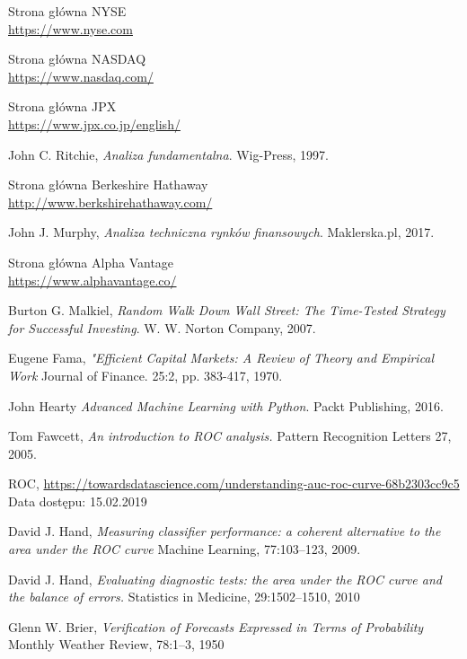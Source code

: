 \documentclass[a4paper, twoside, 11pt, openright]{article}
\begin{document}
\begin{thebibliography}{9}
  
Strona główna NYSE
\\\url{https://www.nyse.com}
 
Strona główna NASDAQ
\\\url{https://www.nasdaq.com/}

Strona główna JPX
\\\url{https://www.jpx.co.jp/english/}

  John C. Ritchie,
  \textit{Analiza fundamentalna}.
  Wig-Press,
  1997.
  
Strona główna Berkeshire Hathaway
\\\url{http://www.berkshirehathaway.com/}

  John J. Murphy,
  \textit{Analiza techniczna rynków finansowych}.
  Maklerska.pl,
  2017.

Strona główna Alpha Vantage
\\\url{https://www.alphavantage.co/}

  Burton G. Malkiel,
  \textit{Random Walk Down Wall Street: The Time-Tested Strategy for Successful Investing}.
  W. W. Norton Company,
  2007.

  Eugene Fama,
  \textit{"Efficient Capital Markets: A Review of Theory and Empirical Work}
  Journal of Finance. 25:2, pp. 383-417, 1970.

  John Hearty
  \textit{Advanced Machine Learning with Python}.
  Packt Publishing,
  2016.

	Tom Fawcett, 
  \textit{An introduction to ROC analysis.}
  Pattern Recognition Letters 27,
  2005.

	ROC, \url{https://towardsdatascience.com/understanding-auc-roc-curve-68b2303cc9c5} 
	Data dostępu: 15.02.2019

	David J. Hand, 
  \textit{Measuring classifier performance: a coherent alternative to the area under the ROC curve}
  Machine Learning, 77:103–123, 2009.

	David J. Hand, 
  \textit{Evaluating diagnostic tests: the area under the ROC curve and the balance of errors.}
 Statistics in Medicine, 29:1502–1510, 2010

	Glenn W. Brier, 
  \textit{Verification of Forecasts Expressed in Terms of Probability}
  Monthly Weather Review, 78:1–3, 1950


\end{thebibliography}
\end{document}
